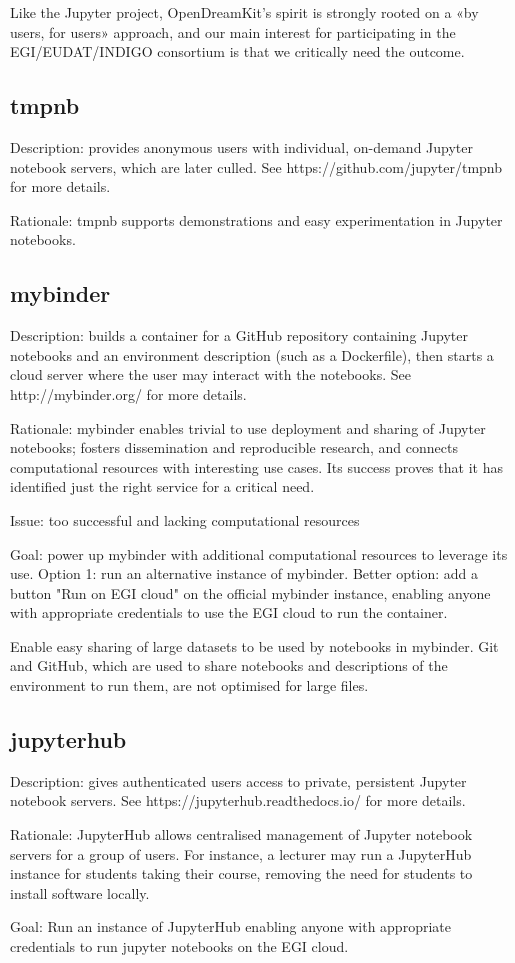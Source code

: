 Like the Jupyter project, OpenDreamKit's spirit is strongly rooted on
a «by users, for users» approach, and our main interest for
participating in the EGI/EUDAT/INDIGO consortium is that we critically
need the outcome.

\subsection{tmpnb}

Description: provides anonymous users with individual, on-demand Jupyter
notebook servers, which are later culled. See https://github.com/jupyter/tmpnb
for more details.

Rationale: tmpnb supports demonstrations and easy experimentation in
Jupyter notebooks.


\subsection{mybinder}

Description: builds a container for a GitHub repository containing
Jupyter notebooks and an environment description (such as a
Dockerfile), then starts a cloud server where the user may interact
with the notebooks. See http://mybinder.org/ for more details.

Rationale: mybinder enables trivial to use deployment and sharing of
Jupyter notebooks; fosters dissemination and reproducible research,
and connects computational resources with interesting use cases.
Its success proves that it has identified just the right service for
a critical need.

Issue: too successful and lacking computational resources

Goal: power up mybinder with additional computational resources to
leverage its use. Option 1: run an alternative instance of mybinder.
Better option: add a button "Run on EGI cloud" on the official
mybinder instance, enabling anyone with appropriate credentials to use
the EGI cloud to run the container.

Enable easy sharing of large datasets to be used by notebooks in mybinder. Git
and GitHub, which are used to share notebooks and descriptions of the
environment to run them, are not optimised for large files.

\subsection{jupyterhub}

Description: gives authenticated users access to private, persistent Jupyter
notebook servers. See https://jupyterhub.readthedocs.io/ for more details.

Rationale: JupyterHub allows centralised management of Jupyter notebook servers
for a group of users. For instance, a lecturer may run a JupyterHub instance for
students taking their course, removing the need for students to install software
locally.

Goal: Run an instance of JupyterHub enabling anyone with appropriate
credentials to run jupyter notebooks on the EGI cloud.
